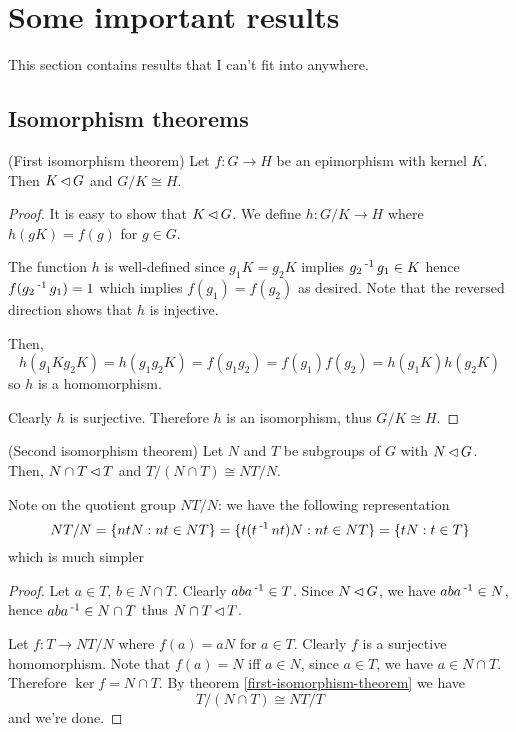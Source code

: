 \documentclass[12pt]{article}
\begin{document}
\newpage
\section{Some important results}
This section contains results that I can't fit into anywhere.
\subsection{Isomorphism theorems}
	\begin{theorem}\label{first-isomorphism-theorem}
		(First isomorphism theorem) Let $f: G\to H$ be an epimorphism with kernel $K$. Then $K \operatorname{\vartriangleleft} G$ and $G/K \cong H$.
	\end{theorem}
	\begin{proof}
		It is easy to show that $K \operatorname{\vartriangleleft} G$. We define $h: G/K \to H$ where $h(gK) = f(g)$ for $g\in G$. 

		The function $h$ is well-defined since $g_1 K = g_2 K$ implies $g_2\operatorname{^{-1}} g_1 \in K$ hence $f(g_2\operatorname{^{-1}} g_1) = 1$ which implies $f(g_1)=f(g_2)$ as desired. Note that the reversed direction shows that $h$ is injective.

		Then, 
		$$h(g_1Kg_2K) = h(g_1g_2K) = f(g_1g_2) = f(g_1)f(g_2) = h(g_1K)h(g_2K)$$
		so $h$ is a homomorphism.

		Clearly $h$ is surjective. Therefore $h$ is an isomorphism, thus $G/K \cong H$.
	\end{proof}

	\begin{theorem}\label{second-isomorphism-theorem}
		(Second isomorphism theorem) Let $N$ and $T$ be subgroups of $G$ with $N \operatorname{\vartriangleleft} G$. Then, $N\cap T \operatorname{\vartriangleleft} T$ and $T/(N \cap T) \cong NT/N$.
	\end{theorem}

	Note on the quotient group $NT/N$: we have the following representation
	$$NT/N = \{ntN : nt\in NT\} = \{t(t\operatorname{^{-1}} nt)N : nt\in NT\} = \{tN : t\in T\}$$
	which is much simpler

	\begin{proof}
		Let $a\in T$, $b\in N\cap T$. Clearly $aba\operatorname{^{-1}} \in T$. Since $N\operatorname{\vartriangleleft} G$, we have $aba\operatorname{^{-1}} \in N$, hence $aba\operatorname{^{-1}} \in N\cap T$ thus $N\cap T \operatorname{\vartriangleleft} T$.

		Let $f: T \to NT/N$ where $f(a) = aN$ for $a\in T$. Clearly $f$ is a surjective homomorphism. Note that $f(a) = N$ iff $a\in N$, since $a\in T$, we have $a\in N\cap T$. Therefore $\ker f = N\cap T$. By theorem \ref{first-isomorphism-theorem} we have
		$$T/(N\cap T) \cong NT/T$$
		and we're done. 
	\end{proof}
\end{document}
